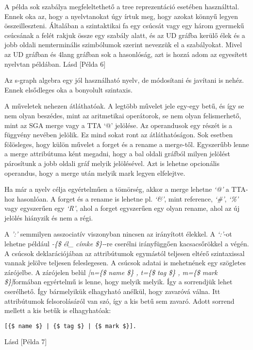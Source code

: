 A példa sok szabálya megfeleltethető a tree reprezentáció esetében használttal. Ennek oka az, hogy a nyelvtanokat úgy írtuk meg, hogy azokat könnyű legyen összeilleszteni. Általában a szintaktikai fa egy csúcsát vagy egy három gyermekű csúcsának a felét rakjuk össze egy szabály alatt, és az UD gráfba kerülő élek és a jobb oldali nemterminális szimbólumok szerint nevezzük el a szabályokat. Mivel az UD gráfban és 4lang gráfban sok a hasonlóság, azt is hozzá adom az egyesített nyelvtan példában. Lásd [Példa 6]

Az s-graph algebra egy jól használható nyelv, de módosítani és javítani is nehéz. Ennek elsődleges oka a bonyolult szintaxis.

A műveletek nehezen átláthatóak. A legtöbb művelet jele egy-egy betű, és így se nem olyan beszédes, mint az aritmetikai operátorok, se nem olyan felismerhető, mint az SGA merge vagy a TTA ‘@’ jelölése. Az operandusok egy részét is a függvény nevében jelölik.  Ez mind sokat ront az átláthatóságon. Sok esetben fölösleges, hogy külön művelet a forget és a rename a merge-től. Egyszerűbb lenne a merge attribútuma ként megadni, hogy a bal oldali gráfból milyen jelölést párosítunk a jobb oldali gráf melyik jelölésével. Azt is lehetne opcionális operandus, hogy a merge után melyik mark legyen elfelejtve.

Ha már a nyelv célja egyértelműen a tömörség, akkor a merge lehetne \textit{‘@’} a TTA-hoz hasonlóan. A forget és a rename is lehetne pl. \textit{‘\&’}, mint reference, \textit{‘\#’}, \textit{‘\%’} vagy egyszerűen egy \textit{‘R’}, ahol a forget egyszerűen egy olyan rename, ahol az új jelölés hiányzik és nem a régi.

A \textit{':'} semmilyen asszociatív viszonyban nincsen az irányított élekkel. A \textit{‘:’}-ot lehetne például \textit{-\{\$ él\_ címke \$\}-}-re cserélni irányfüggően kacsacsőrökkel a végén.
A csúcsok deklarációjában az attribútumok egymástól teljesen eltérő szintaxissal vannak jelölve teljesen feleslegesen. A csúcsok adatai is mehetnének egy szögletes zárójelbe. A zárójelen belül \textit{[n=\{\$ name \$\} , t=\{\$ tag \$\} , m=\{\$ mark \$\}]}formában egyértelmű is lenne, hogy melyik melyik. Így a sorrendjük lehet cserélhető. Így bármelyikük elhagyható anélkül, hogy zavaróvá válna. Itt attribútumok felsorolásáról van szó, így a kis betű sem zavaró. Adott sorrend mellett a kis betűk is elhagyhatóak:
\begin{verbatim}
[{$ name $} | {$ tag $} | {$ mark $}].
\end{verbatim}
Lásd [Példa 7]


